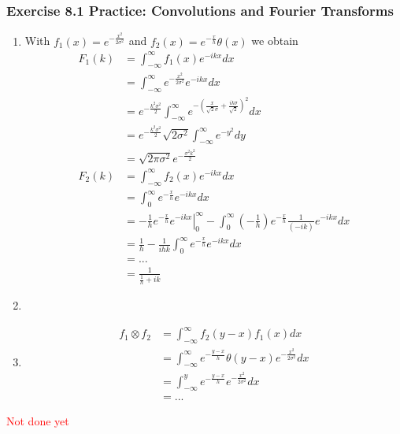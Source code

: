 \documentclass[10pt,a4paper]{article}
\theoremstyle{definition}
\begin{document}
\subsubsection{Exercise 8.1 Practice: Convolutions and Fourier Transforms}
\begin{enumerate}[label=(\alph*)]
\item With $f_1(x)=e^{-\frac{x^2}{2\sigma^2}}$ and $f_2(x)=e^{-\frac{x}{h}}\theta(x)$ we obtain
\begin{align}
    F_1(k)&=\int_{-\infty}^\infty f_1(x)e^{-ikx}dx\\
    &=\int_{-\infty}^\infty e^{-\frac{x^2}{2\sigma^2}}e^{-ikx}dx\\
    &=e^{-\frac{k^2\sigma^2}{2}}\int_{-\infty}^\infty e^{-\left(\frac{x}{\sqrt{2}\sigma}+\frac{ik\sigma}{\sqrt{2}}\right)^2}dx\\
    &=e^{-\frac{k^2\sigma^2}{2}} \sqrt{2\sigma^2} \int_{-\infty}^\infty e^{-y^2}dy\\
    &=\sqrt{2\pi\sigma^2}e^{-\frac{\sigma^2k^2}{2}}\\
    F_2(k)&=\int_{-\infty}^\infty f_2(x)e^{-ikx}dx\\
    &=\int_{0}^\infty e^{-\frac{x}{h}}e^{-ikx}dx\\
    &=-\frac{1}{h}\left.e^{-\frac{x}{h}}e^{-ikx}\right|_0^\infty -\int_{0}^\infty \left(-\frac{1}{h}\right)e^{-\frac{x}{h}}\frac{1}{(-ik)}e^{-ikx}dx\\
    &=\frac{1}{h} -\frac{1}{ihk}\int_{0}^\infty e^{-\frac{x}{h}}e^{-ikx}dx\\
    &= ...\\
    &=\frac{1}{\frac{1}{h}+ik}
\end{align}
\item
\item
\begin{align}
    f_1\otimes f_2
    &=\int_{-\infty}^\infty f_2(y-x)f_1(x)dx\\
    &=\int_{-\infty}^\infty e^{-\frac{y-x}{h}}\theta(y-x)e^{-\frac{x^2}{2\sigma^2}}dx\\
    &=\int_{-\infty}^y e^{-\frac{y-x}{h}}e^{-\frac{x^2}{2\sigma^2}}dx\\
    &=...
\end{align}
\end{enumerate}
\textcolor{red}{Not done yet}
\end{document}
